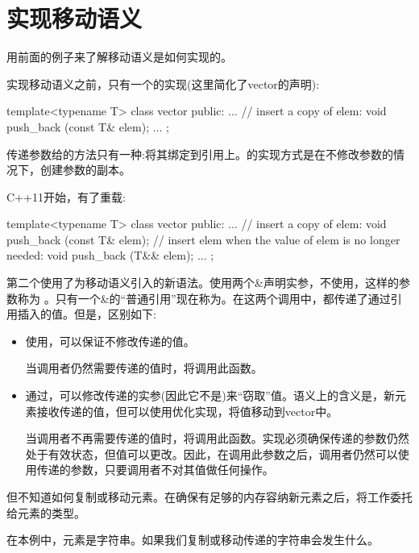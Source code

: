 \section{实现移动语义}
用前面的例子来了解移动语义是如何实现的。

实现移动语义之前，只有一个的实现(这里简化了vector的声明):

\begin{cppcode}
template<typename T>
class vector {
	public:
	...
	// insert a copy of elem:
	void push_back (const T& elem);
	...
};
\end{cppcode}

传递参数给的方法只有一种:将其绑定到引用上。的实现方式是在不修改参数的情况下，创建参数的副本。

C++11开始，有了重载:

\begin{cppcode}
template<typename T>
class vector {
	public:
	...
	// insert a copy of elem:
	void push_back (const T& elem);
	// insert elem when the value of elem is no longer needed:
	void push_back (T&& elem);
	...
};
\end{cppcode}

第二个使用了为移动语义引入的新语法。使用两个\&声明实参，不使用，这样的参数称为 。只有一个\&的“普通引用”现在称为。在这两个调用中，都传递了通过引用插入的值。但是，区别如下:

\begin{itemize}
	\item 使用，可以保证不修改传递的值。

	当调用者仍然需要传递的值时，将调用此函数。
	\item 通过，可以修改传递的实参(因此它不是)来“窃取”值。语义上的含义是，新元素接收传递的值，但可以使用优化实现，将值移动到vector中。

	当调用者不再需要传递的值时，将调用此函数。实现必须确保传递的参数仍然处于有效状态，但值可以更改。因此，在调用此参数之后，调用者仍然可以使用传递的参数，只要调用者不对其值做任何操作。
\end{itemize}

但不知道如何复制或移动元素。在确保有足够的内存容纳新元素之后，将工作委托给元素的类型。

在本例中，元素是字符串。如果我们复制或移动传递的字符串会发生什么。


